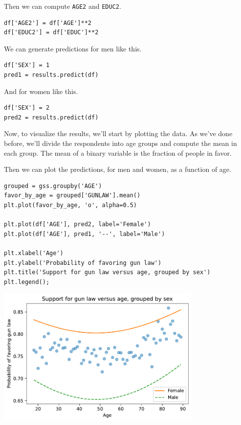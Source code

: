 Then we can compute \passthrough{\lstinline!AGE2!} and
\passthrough{\lstinline!EDUC2!}.

\begin{lstlisting}[]
df['AGE2'] = df['AGE']**2
df['EDUC2'] = df['EDUC']**2
\end{lstlisting}

We can generate predictions for men like this.

\begin{lstlisting}[]
df['SEX'] = 1
pred1 = results.predict(df)
\end{lstlisting}

And for women like this.

\begin{lstlisting}[]
df['SEX'] = 2
pred2 = results.predict(df)
\end{lstlisting}

Now, to visualize the results, we'll start by plotting the data. As
we've done before, we'll divide the respondents into age groups and
compute the mean in each group. The mean of a binary variable is the
fraction of people in favor.

Then we can plot the predictions, for men and women, as a function of
age.

\begin{lstlisting}[]
grouped = gss.groupby('AGE')
favor_by_age = grouped['GUNLAW'].mean()
plt.plot(favor_by_age, 'o', alpha=0.5)

plt.plot(df['AGE'], pred2, label='Female')
plt.plot(df['AGE'], pred1, '--', label='Male')

plt.xlabel('Age')
plt.ylabel('Probability of favoring gun law')
plt.title('Support for gun law versus age, grouped by sex')
plt.legend();
\end{lstlisting}

\begin{center}
\includegraphics[width=4in]{chapters/10_regression_files/10_regression_83_0.pdf}
\end{center}


